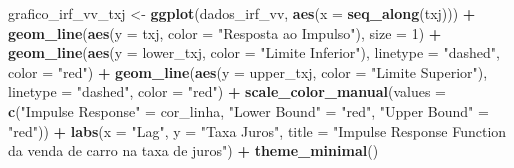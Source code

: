 \documentclass[
]{article}
\newenvironment{Shaded}{\begin{snugshade}}{\end{snugshade}}
\newcommand{\AttributeTok}[1]{\textcolor[rgb]{0.13,0.29,0.53}{#1}}
\newcommand{\DecValTok}[1]{\textcolor[rgb]{0.00,0.00,0.81}{#1}}
\newcommand{\FunctionTok}[1]{\textcolor[rgb]{0.13,0.29,0.53}{\textbf{#1}}}
\newcommand{\NormalTok}[1]{#1}
\newcommand{\OtherTok}[1]{\textcolor[rgb]{0.56,0.35,0.01}{#1}}
\newcommand{\SpecialCharTok}[1]{\textcolor[rgb]{0.81,0.36,0.00}{\textbf{#1}}}
\newcommand{\StringTok}[1]{\textcolor[rgb]{0.31,0.60,0.02}{#1}}
\begin{document}
\begin{Shaded}
\begin{Highlighting}[]
\NormalTok{grafico\_irf\_vv\_txj }\OtherTok{\textless{}{-}} \FunctionTok{ggplot}\NormalTok{(dados\_irf\_vv, }\FunctionTok{aes}\NormalTok{(}\AttributeTok{x =} \FunctionTok{seq\_along}\NormalTok{(txj))) }\SpecialCharTok{+}
  \FunctionTok{geom\_line}\NormalTok{(}\FunctionTok{aes}\NormalTok{(}\AttributeTok{y =}\NormalTok{ txj, }\AttributeTok{color =} \StringTok{"Resposta ao Impulso"}\NormalTok{), }\AttributeTok{size =} \DecValTok{1}\NormalTok{) }\SpecialCharTok{+}
  \FunctionTok{geom\_line}\NormalTok{(}\FunctionTok{aes}\NormalTok{(}\AttributeTok{y =}\NormalTok{ lower\_txj, }\AttributeTok{color =} \StringTok{"Limite Inferior"}\NormalTok{), }\AttributeTok{linetype =} \StringTok{"dashed"}\NormalTok{, }\AttributeTok{color =} \StringTok{"red"}\NormalTok{) }\SpecialCharTok{+}
  \FunctionTok{geom\_line}\NormalTok{(}\FunctionTok{aes}\NormalTok{(}\AttributeTok{y =}\NormalTok{ upper\_txj, }\AttributeTok{color =} \StringTok{"Limite Superior"}\NormalTok{), }\AttributeTok{linetype =} \StringTok{"dashed"}\NormalTok{, }\AttributeTok{color =} \StringTok{"red"}\NormalTok{) }\SpecialCharTok{+}
  \FunctionTok{scale\_color\_manual}\NormalTok{(}\AttributeTok{values =} \FunctionTok{c}\NormalTok{(}\StringTok{"Impulse Response"} \OtherTok{=}\NormalTok{ cor\_linha, }\StringTok{"Lower Bound"} \OtherTok{=} \StringTok{"red"}\NormalTok{, }\StringTok{"Upper Bound"} \OtherTok{=} \StringTok{"red"}\NormalTok{)) }\SpecialCharTok{+}
  \FunctionTok{labs}\NormalTok{(}\AttributeTok{x =} \StringTok{"Lag"}\NormalTok{, }\AttributeTok{y =} \StringTok{"Taxa Juros"}\NormalTok{, }\AttributeTok{title =} \StringTok{"Impulse Response Function da venda de carro na taxa de juros"}\NormalTok{) }\SpecialCharTok{+}
  \FunctionTok{theme\_minimal}\NormalTok{()}



\end{Highlighting}
\end{Shaded}
\end{document}

